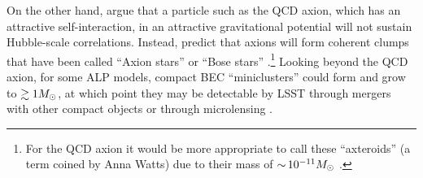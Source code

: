 On the other hand, \citet{1412.5930} argue that a particle such as the QCD axion, which has an attractive self-interaction, in an attractive gravitational potential will not sustain Hubble-scale correlations.
Instead, \citet{1412.5930} predict that axions will form coherent clumps that have been called ``Axion stars'' or ``Bose stars'' \citep[\eg][]{Kolb:1993}.\footnote{For the QCD axion it would be more appropriate to call these ``axteroids'' (a term coined by Anna Watts) due to their mass of $ {\sim}\, 10^{-11} M_\odot$ \citep{Tkachev:1991ka,Braaten:2018nag}.} 
Looking beyond the QCD axion, for some ALP models, compact BEC ``miniclusters'' could form and grow to $\gtrsim 1M_\odot$, at which point they may be detectable by LSST through mergers with other compact objects \citep{1808.04746} or through microlensing \citep{1707.03310}.




